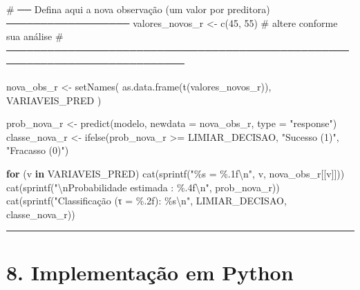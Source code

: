 \documentclass[
  letterpaper,
  DIV=11,
  numbers=noendperiod]{scrartcl}
\newenvironment{Shaded}{\begin{snugshade}}{\end{snugshade}}
\newcommand{\AttributeTok}[1]{\textcolor[rgb]{0.40,0.45,0.13}{#1}}
\newcommand{\CommentTok}[1]{\textcolor[rgb]{0.37,0.37,0.37}{#1}}
\newcommand{\ControlFlowTok}[1]{\textcolor[rgb]{0.00,0.23,0.31}{\textbf{#1}}}
\newcommand{\DecValTok}[1]{\textcolor[rgb]{0.68,0.00,0.00}{#1}}
\newcommand{\FunctionTok}[1]{\textcolor[rgb]{0.28,0.35,0.67}{#1}}
\newcommand{\NormalTok}[1]{\textcolor[rgb]{0.00,0.23,0.31}{#1}}
\newcommand{\OtherTok}[1]{\textcolor[rgb]{0.00,0.23,0.31}{#1}}
\newcommand{\SpecialCharTok}[1]{\textcolor[rgb]{0.37,0.37,0.37}{#1}}
\newcommand{\StringTok}[1]{\textcolor[rgb]{0.13,0.47,0.30}{#1}}
\begin{document}
\begin{Shaded}
\begin{Highlighting}[]
\CommentTok{\# ── Defina aqui a nova observação (um valor por preditora) ──────────────────}
\NormalTok{valores\_novos\_r }\OtherTok{\textless{}{-}} \FunctionTok{c}\NormalTok{(}\DecValTok{45}\NormalTok{, }\DecValTok{55}\NormalTok{)   }\CommentTok{\# altere conforme sua análise}
\CommentTok{\# ────────────────────────────────────────────────────────────────────────────}

\NormalTok{nova\_obs\_r }\OtherTok{\textless{}{-}} \FunctionTok{setNames}\NormalTok{(}
  \FunctionTok{as.data.frame}\NormalTok{(}\FunctionTok{t}\NormalTok{(valores\_novos\_r)),}
\NormalTok{  VARIAVEIS\_PRED}
\NormalTok{)}

\NormalTok{prob\_nova\_r  }\OtherTok{\textless{}{-}} \FunctionTok{predict}\NormalTok{(modelo, }\AttributeTok{newdata =}\NormalTok{ nova\_obs\_r, }\AttributeTok{type =} \StringTok{"response"}\NormalTok{)}
\NormalTok{classe\_nova\_r }\OtherTok{\textless{}{-}} \FunctionTok{ifelse}\NormalTok{(prob\_nova\_r }\SpecialCharTok{\textgreater{}=}\NormalTok{ LIMIAR\_DECISAO,}
                        \StringTok{"Sucesso (1)"}\NormalTok{, }\StringTok{"Fracasso (0)"}\NormalTok{)}

\ControlFlowTok{for}\NormalTok{ (v }\ControlFlowTok{in}\NormalTok{ VARIAVEIS\_PRED)}
  \FunctionTok{cat}\NormalTok{(}\FunctionTok{sprintf}\NormalTok{(}\StringTok{"\%s = \%.1f}\SpecialCharTok{\textbackslash{}n}\StringTok{"}\NormalTok{, v, nova\_obs\_r[[v]]))}
\FunctionTok{cat}\NormalTok{(}\FunctionTok{sprintf}\NormalTok{(}\StringTok{"}\SpecialCharTok{\textbackslash{}n}\StringTok{Probabilidade estimada : \%.4f}\SpecialCharTok{\textbackslash{}n}\StringTok{"}\NormalTok{, prob\_nova\_r))}
\FunctionTok{cat}\NormalTok{(}\FunctionTok{sprintf}\NormalTok{(}\StringTok{"Classificação (τ = \%.2f): \%s}\SpecialCharTok{\textbackslash{}n}\StringTok{"}\NormalTok{, LIMIAR\_DECISAO, classe\_nova\_r))}
\end{Highlighting}
\end{Shaded}

\begin{center}\rule{0.5\linewidth}{0.5pt}\end{center}

\section{8. Implementação em
Python}\label{implementauxe7uxe3o-em-python}
\end{document}
